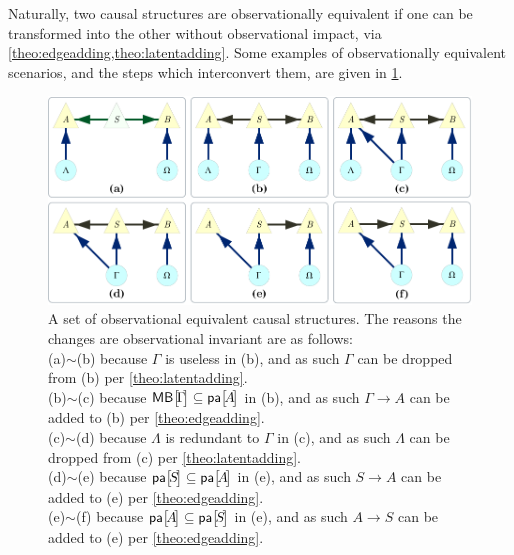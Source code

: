 \clearpage
Naturally, two causal structures are observationally equivalent if one can be transformed into the other without observational impact, via \cref{theo:edgeadding,theo:latentadding}. Some examples of observationally equivalent scenarios, and the steps which interconvert them, are given in \cref{fig:equivalences}.
\begin{figure}[hb]
\centering
\includegraphics[width=\linewidth]{ObservationalEquivalencesExamples.pdf}
\caption{A set of observational equivalent causal structures. The reasons the changes are observational invariant are as follows: \\
(a)$\sim$(b) because $\Gamma$ is useless in (b), and as such $\Gamma$ can be dropped from (b) per \cref{theo:latentadding}.\\
(b)$\sim$(c) because $\NamedFunction{MB}{\!\Gamma\!}\subseteq\NamedFunction{pa}{\!A\!}$ in (b), and as such $\Gamma\to A$ can be added to (b) per \cref{theo:edgeadding}.\\
(c)$\sim$(d) because $\Lambda$ is redundant to $\Gamma$ in (c), and as such $\Lambda$ can be dropped from (c) per \cref{theo:latentadding}.\\
(d)$\sim$(e) because $\NamedFunction{pa}{\!S\!}\subseteq\NamedFunction{pa}{\!A\!}$ in (e), and as such $S\to A$ can be added to (e) per \cref{theo:edgeadding}.\\
(e)$\sim$(f) because $\NamedFunction{pa}{\!A\!}\subseteq\NamedFunction{pa}{\!S\!}$ in (e), and as such $A\to S$ can be added to (e) per \cref{theo:edgeadding}.
}\label{fig:equivalences}
\end{figure}


